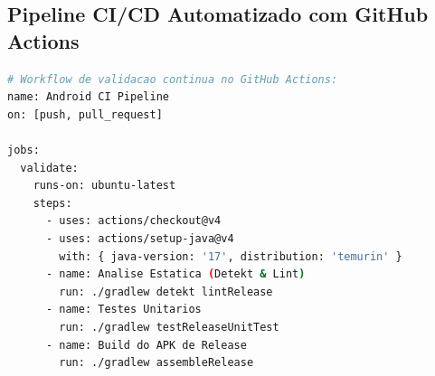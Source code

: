 \subsection{Pipeline CI/CD Automatizado com GitHub Actions}
\begin{lstlisting}[language=bash, caption={Etapas Críticas de uma Pipeline CI/CD Android}]
# Workflow de validacao continua no GitHub Actions:
name: Android CI Pipeline
on: [push, pull_request]

jobs:
  validate:
    runs-on: ubuntu-latest
    steps:
      - uses: actions/checkout@v4
      - uses: actions/setup-java@v4
        with: { java-version: '17', distribution: 'temurin' }
      - name: Analise Estatica (Detekt & Lint)
        run: ./gradlew detekt lintRelease
      - name: Testes Unitarios
        run: ./gradlew testReleaseUnitTest
      - name: Build do APK de Release
        run: ./gradlew assembleRelease
\end{lstlisting}
